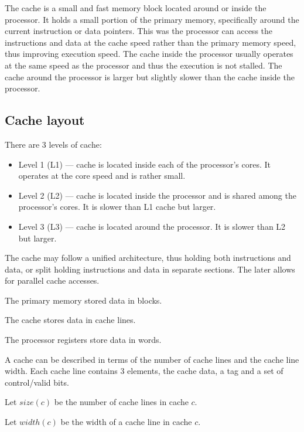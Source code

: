 \documentclass{report}
\begin{document}
The cache is a small and fast memory block located around or inside the
processor. It holds a small portion of the primary memory, specifically around
the current instruction or data pointers. This was the processor can access
the instructions and data at the cache speed rather than the primary memory
speed, thus improving execution speed. The cache inside the processor usually
operates at the same speed as the processor and thus the execution is not
stalled. The cache around the processor is larger but slightly slower than the
cache inside the processor.

\subsection{Cache layout}

There are 3 levels of cache:

\begin{itemize}
    \item{Level 1 (L1) --- cache is located inside each of the processor's
        cores. It operates at the core speed and is rather small.}

    \item{Level 2 (L2) --- cache is located inside the processor and is shared
        among the processor's cores. It is slower than L1 cache but larger.}

    \item{Level 3 (L3) --- cache is located around the processor. It is slower
        than L2 but larger.}

\end{itemize}

The cache may follow a unified architecture, thus holding both instructions and
data, or split holding instructions and data in separate sections. The later
allows for parallel cache accesses.

The primary memory stored data in blocks.

The cache stores data in cache lines.

The processor registers store data in words.

A cache can be described in terms of the number of cache lines and the cache
line width. Each cache line contains 3 elements, the cache data, a tag and a set
of control/valid bits.

Let $size(c)$ be the number of cache lines in cache $c$.

Let $width(c)$ be the width of a cache line in cache $c$.
\end{document}
